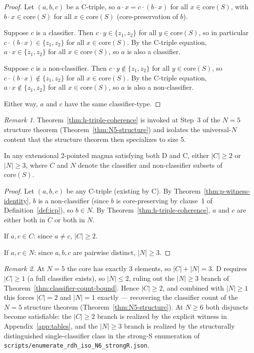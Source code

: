 \documentclass[sigconf,screen]{acmart}
\newcommand{\dotop}{\cdot}
\newcommand{\core}{\mathrm{core}}
\theoremstyle{remark}
\newtheorem{remark}{Remark}
\begin{document}
\begin{proof}
Let $(a, b, c)$ be a C-triple, so $a \dotop x = c \dotop (b \dotop x)$ for all $x \in \core(S)$, with $b \dotop x \in \core(S)$ for all $x \in \core(S)$ (core-preservation of $b$).

Suppose $c$ is a classifier. Then $c \dotop y \in \{z_1, z_2\}$ for all $y \in \core(S)$, so in particular $c \dotop (b \dotop x) \in \{z_1, z_2\}$ for all $x \in \core(S)$. By the C-triple equation, $a \dotop x \in \{z_1, z_2\}$ for all $x \in \core(S)$, so $a$ is also a classifier.

Suppose $c$ is a non-classifier. Then $c \dotop y \notin \{z_1, z_2\}$ for all $y \in \core(S)$, so $c \dotop (b \dotop x) \notin \{z_1, z_2\}$ for all $x \in \core(S)$. By the C-triple equation, $a \dotop x \notin \{z_1, z_2\}$ for all $x \in \core(S)$, so $a$ is also a non-classifier.

Either way, $a$ and $c$ have the same classifier-type.
\end{proof}

\begin{remark}
Theorem~\ref{thm:h-triple-coherence} is invoked at Step~3 of the $N=5$ structure theorem (Theorem~\ref{thm:N5-structure}) and isolates the universal-$N$ content that the structure theorem then specializes to size 5.
\end{remark}

\begin{theorem}
\label{thm:classifier-count-bound}
In any extensional 2-pointed magma satisfying both D and C, either $|C| \geq 2$ or $|N| \geq 3$, where $C$ and $N$ denote the classifier and non-classifier subsets of $\core(S)$.
\end{theorem}

\begin{proof}
Let $(a, b, c)$ be any C-triple (existing by C). By Theorem~\ref{thm:p-witness-identity}, $b$ is a non-classifier (since $b$ is core-preserving by clause~1 of Definition~\ref{def:icp}), so $b \in N$. By Theorem~\ref{thm:h-triple-coherence}, $a$ and $c$ are either both in $C$ or both in $N$.

If $a, c \in C$: since $a \neq c$, $|C| \geq 2$.

If $a, c \in N$: since $a, b, c$ are pairwise distinct, $|N| \geq 3$.
\end{proof}

\begin{remark}
At $N = 5$ the core has exactly $3$ elements, so $|C| + |N| = 3$. D requires $|C| \geq 1$ (a full classifier exists), so $|N| \leq 2$, ruling out the $|N| \geq 3$ branch of Theorem~\ref{thm:classifier-count-bound}. Hence $|C| \geq 2$, and combined with $|N| \geq 1$ this forces $|C| = 2$ and $|N| = 1$ exactly --- recovering the classifier count of the $N = 5$ structure theorem (Theorem~\ref{thm:N5-structure}). At $N \geq 6$ both disjuncts become satisfiable: the $|C| \geq 2$ branch is realized by the explicit witness in Appendix~\ref{app:tables}, and the $|N| \geq 3$ branch is realized by the structurally distinguished single-classifier class in the strong-S enumeration of \texttt{scripts/enumerate\_rdh\_iso\_N6\_strongR.json}.
\end{remark}
\end{document}

